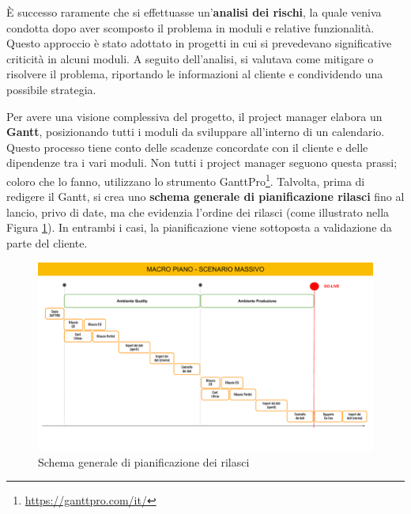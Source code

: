         È successo raramente che si effettuasse un'\textbf{analisi dei rischi}, la quale veniva condotta dopo aver scomposto il problema in moduli
        e relative funzionalità. Questo approccio è stato adottato in progetti in cui si prevedevano significative criticità in alcuni moduli.
        A seguito dell'analisi, si valutava come mitigare o risolvere il problema, riportando le informazioni al cliente e condividendo una possibile strategia.

        Per avere una visione complessiva del progetto, il project manager elabora un \textbf{Gantt}, posizionando tutti i moduli da sviluppare all'interno di un
        calendario. Questo processo tiene conto delle scadenze concordate con il cliente e delle dipendenze tra i vari moduli. Non tutti i project manager
        seguono questa prassi; coloro che lo fanno, utilizzano lo strumento GanttPro\footnote{\url{https://ganttpro.com/it/}}. Talvolta, prima di redigere il Gantt, si crea uno \textbf{schema generale di pianificazione
        rilasci} fino al lancio, privo di date, ma che evidenzia l’ordine dei rilasci (come illustrato nella Figura \ref{fig:schema-rilasci}). In entrambi i casi, la pianificazione
        viene sottoposta a validazione da parte del cliente.

        \begin{figure}
            \centering
            \includegraphics[width=\linewidth]{figures/pianoRilasci.pdf}
            \caption{Schema generale di pianificazione dei rilasci}
            \label{fig:schema-rilasci}
        \end{figure}

